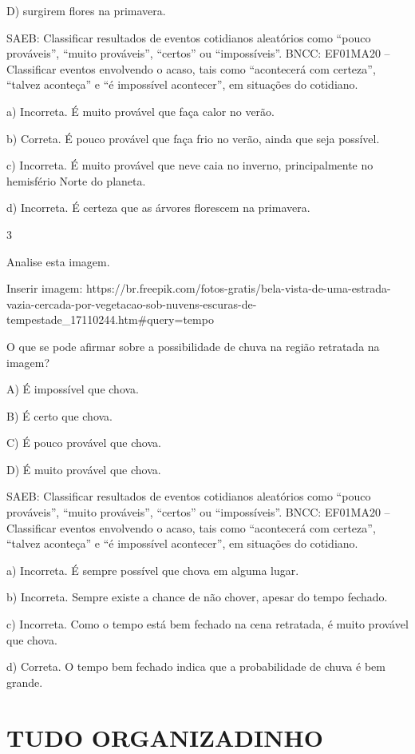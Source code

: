 D) surgirem flores na primavera.

SAEB: Classificar resultados de eventos cotidianos aleatórios como
``pouco prováveis'', ``muito prováveis'', ``certos'' ou ``impossíveis''.
BNCC: EF01MA20 -- Classificar eventos envolvendo o acaso, tais como
``acontecerá com certeza'', ``talvez aconteça'' e ``é impossível
acontecer'', em situações do cotidiano.

a) Incorreta. É muito provável que faça calor no verão.

b) Correta. É pouco provável que faça frio no verão, ainda que seja
possível.

c) Incorreta. É muito provável que neve caia no inverno, principalmente
no hemisfério Norte do planeta.

d) Incorreta. É certeza que as árvores florescem na primavera.

\num{3}

Analise esta imagem.

Inserir imagem: https://br.freepik.com/fotos-gratis/bela-vista-de-uma-estrada-vazia-cercada-por-vegetacao-sob-nuvens-escuras-de-tempestade_17110244.htm#query=tempo%

O que se pode afirmar sobre a possibilidade de chuva na região retratada na imagem?

A) É impossível que chova.

B) É certo que chova.

C) É pouco provável que chova.

D) É muito provável que chova.

SAEB: Classificar
resultados de eventos cotidianos aleatórios como ``pouco prováveis'',
``muito prováveis'', ``certos'' ou ``impossíveis''.
BNCC: EF01MA20 -- Classificar eventos envolvendo o acaso, tais como
``acontecerá com certeza'', ``talvez aconteça'' e ``é impossível
acontecer'', em situações do cotidiano.

a) Incorreta. É sempre possível que chova em alguma lugar.

b) Incorreta. Sempre existe a chance de não chover, apesar do tempo fechado.

c) Incorreta. Como o tempo está bem fechado na cena retratada, é muito provável que chova.

d) Correta. O tempo bem fechado indica que a probabilidade de chuva é bem grande.

\chapter{TUDO ORGANIZADINHO}

